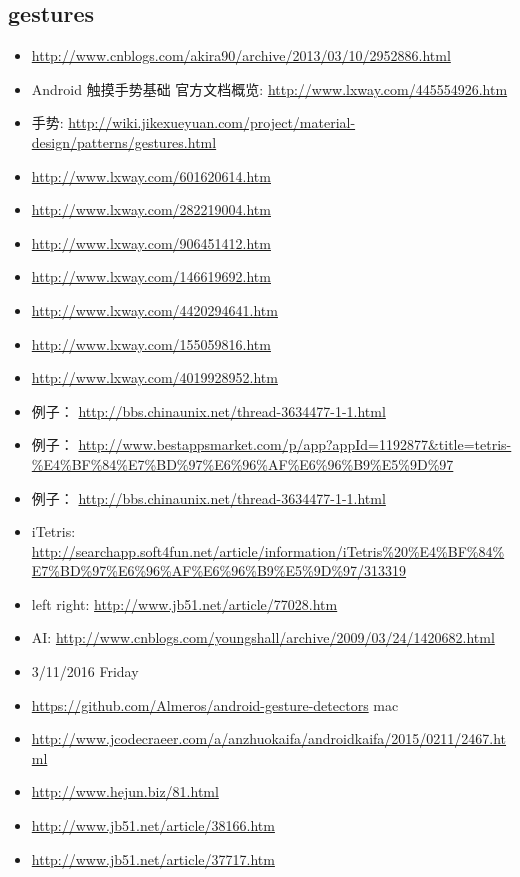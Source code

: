 \documentclass[9pt,b5paper]{article}
\begin{document}
\subsection{gestures}
\label{sec-2-8}
\begin{itemize}
\item \url{http://www.cnblogs.com/akira90/archive/2013/03/10/2952886.html}
\item Android 触摸手势基础 官方文档概览: \url{http://www.lxway.com/445554926.htm}
\item 手势: \url{http://wiki.jikexueyuan.com/project/material-design/patterns/gestures.html}
\item \url{http://www.lxway.com/601620614.htm}
\item \url{http://www.lxway.com/282219004.htm}
\item \url{http://www.lxway.com/906451412.htm}
\item \url{http://www.lxway.com/146619692.htm}
\item \url{http://www.lxway.com/4420294641.htm}
\item \url{http://www.lxway.com/155059816.htm}
\item \url{http://www.lxway.com/4019928952.htm}
\item 例子： \url{http://bbs.chinaunix.net/thread-3634477-1-1.html}
\item 例子： \url{http://www.bestappsmarket.com/p/app?appId=1192877&title=tetris-\%E4\%BF\%84\%E7\%BD\%97\%E6\%96\%AF\%E6\%96\%B9\%E5\%9D\%97}
\item 例子： \url{http://bbs.chinaunix.net/thread-3634477-1-1.html}
\item iTetris: \url{http://searchapp.soft4fun.net/article/information/iTetris\%20\%E4\%BF\%84\%E7\%BD\%97\%E6\%96\%AF\%E6\%96\%B9\%E5\%9D\%97/313319}
\item left right: \url{http://www.jb51.net/article/77028.htm}
\item AI: \url{http://www.cnblogs.com/youngshall/archive/2009/03/24/1420682.html}
\item 3/11/2016 Friday
\item \url{https://github.com/Almeros/android-gesture-detectors} mac
\item \url{http://www.jcodecraeer.com/a/anzhuokaifa/androidkaifa/2015/0211/2467.html}
\item \url{http://www.hejun.biz/81.html}
\item \url{http://www.jb51.net/article/38166.htm}
\item \url{http://www.jb51.net/article/37717.htm}

\end{itemize}
\end{document}

